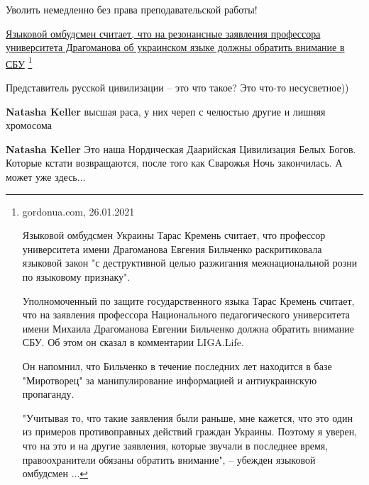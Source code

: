 \begin{itemize}
Уволить немедленно без права преподавательской работы!

\href{https://gordonua.com/news/politics/yazykovoy-ombudsmen-ukrainy-schitaet-chto-na-zayavleniya-bilchenko-ob-ukrainskom-yazyke-dolzhny-obratit-vnimanie-v-sbu-1537248.html}{Языковой
омбудсмен считает, что на резонансные заявления профессора университета
Драгоманова об украинском языке должны обратить внимание в СБУ}
\footnote{
gordonua.com, 26.01.2021

Языковой омбудсмен Украины Тарас Кремень считает, что профессор университета
имени Драгоманова Евгения Бильченко раскритиковала языковой закон "с
деструктивной целью разжигания межнациональной розни по языковому признаку".

Уполномоченный по защите государственного языка Тарас Кремень считает, что на
заявления профессора Национального педагогического университета имени Михаила
Драгоманова Евгении Бильченко должна обратить внимание СБУ. Об этом он сказал в
комментарии LIGA.Life.

Он напомнил, что Бильченко в течение последних лет находится в базе
"Миротворец" за манипулирование информацией и антиукраинскую пропаганду.

"Учитывая то, что такие заявления были раньше, мне кажется, что это один из
примеров противоправных действий граждан Украины. Поэтому я уверен, что на это
и на другие заявления, которые звучали в последнее время, правоохранители
обязаны обратить внимание", – убежден языковой омбудсмен ...
}



Представитель русской цивилизации – это что такое? Это что-то несусветное))

\begin{itemize}

\textbf{Natasha Keller} высшая раса, у них череп с челюстью другие и лишняя
хромосома


\textbf{Natasha Keller} Это наша Нордическая Даарийская Цивилизация Белых
Богов. Которые кстати возвращаются, после того как Сварожья Ночь закончилась. А
может уже здесь...



\end{itemize}
\end{itemize}

